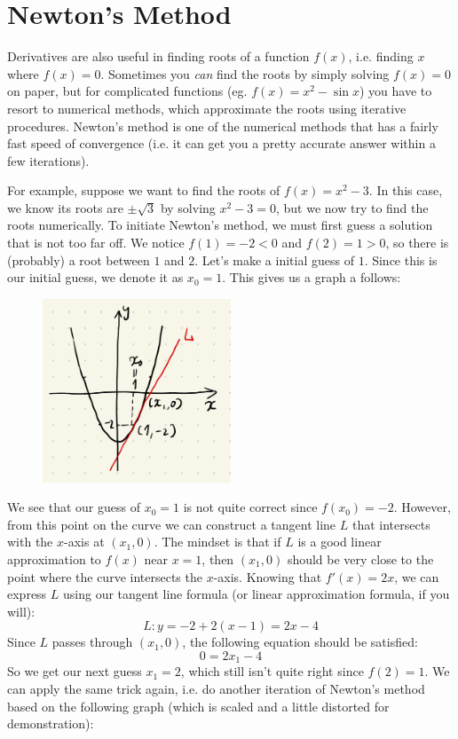 \section{Newton's Method}
Derivatives are also useful in finding roots of a function $f(x)$, i.e. finding $x$ where $f(x) = 0$.  Sometimes you \textit{can} find the roots by simply solving $f(x)=0$ on paper, but for complicated functions (eg. $f(x) = x^2 - \sin x$) you have to resort to numerical methods, which approximate the roots using iterative procedures.  Newton's method is one of the numerical methods that has a fairly fast speed of convergence (i.e. it can get you a pretty accurate answer within a few iterations).

For example, suppose we want to find the roots of $f(x) = x^2-3$.  In this case, we know its roots are $\pm \sqrt{3}$ by solving $x^2-3 = 0$, but we now try to find the roots numerically.  To initiate Newton's method, we must first guess a solution that is not too far off.  We notice $f(1) = -2 < 0$ and $f(2) = 1 > 0$, so there is (probably) a root between $1$ and $2$.  Let's make a initial guess of $1$.  Since this is our initial guess, we denote it as $x_0 = 1$.  This gives us a graph a follows:

\begin{figure}[ht]
    \centering
    \includegraphics[width = 0.5\textwidth]{figures/chap 05/newton_1.png}
    \label{fig: newton_1}
\end{figure}

We see that our guess of $x_0 = 1$ is not quite correct since $f(x_0) = -2$.  However, from this point on the curve we can construct a tangent line $L$ that intersects with the $x$-axis at $(x_1, 0)$.  The mindset is that if $L$ is a good linear approximation to $f(x)$ near $x = 1$, then $(x_1, 0)$ should be very close to the point where the curve intersects the $x$-axis.  Knowing that $f'(x) = 2x$, we can express $L$ using our tangent line formula (or linear approximation formula, if you will):
\[L: y = -2 + 2(x-1) = 2x-4\]
Since $L$ passes through $(x_1, 0)$, the following equation should be satisfied: 
\[0 = 2x_1-4\]
So we get our next guess $x_1 = 2$, which still isn't quite right since $f(2) = 1$.  We can apply the same trick again, i.e. do another iteration of Newton's method based on the following graph (which is scaled and a little distorted for demonstration):

